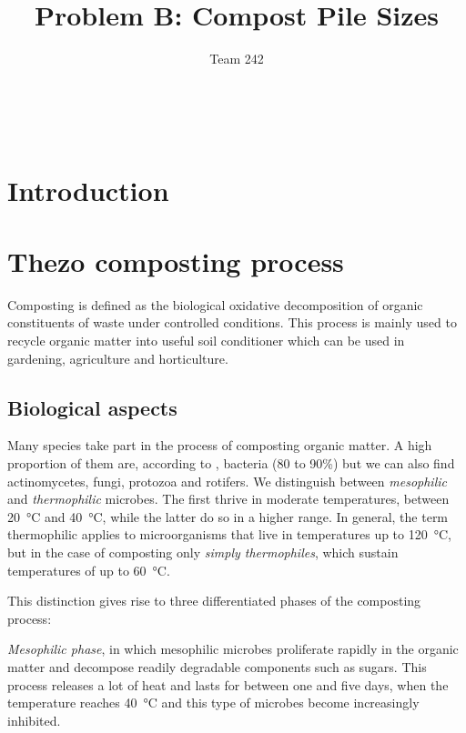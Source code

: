 \documentclass[12pt, a4paper, twocolumn, twoside]{article}
\title{\sffamily \bfseries Problem B: Compost Pile Sizes}
\author{\sffamily Team 242}
\date{}
\numberwithin{table}{section}
\numberwithin{figure}{section}
\numberwithin{equation}{section}
\begin{document}
\renewcommand{\abstractname}{}
\renewcommand{\absnamepos}{empty}
\begin{titlingpage}
 	\maketitle

\noindent \hrulefill \\
\begin{abstract}

\end{abstract}
\hrulefill
\end{titlingpage}

\begin{titlingpage}
	\tableofcontents
\end{titlingpage}

\section{Introduction}
\section{Thezo composting process}
Composting is defined as the biological oxidative decomposition of organic constituents of waste under controlled conditions. This process is mainly used to recycle organic matter into useful soil conditioner which can be used in gardening, agriculture and horticulture.

\subsection{Biological aspects}
Many species take part in the process of composting organic matter. A high proportion of them are, according to \cite{cornell}, bacteria (80 to 90\%) but we can also find actinomycetes, fungi, protozoa and rotifers. We distinguish between \emph{mesophilic} and \emph{thermophilic} microbes. The first thrive in moderate temperatures, between \SI{20}{\celsius} and \SI{40}{\celsius}, while the latter do so in a higher range. In general, the term thermophilic applies to microorganisms that live in temperatures up to \SI{120}{\celsius}, but in the case of composting only \emph{simply thermophiles}, which sustain temperatures of up to \SI{60}{\celsius}.

This distinction gives rise to three differentiated phases of the composting process:

\emph{Mesophilic phase}, in which mesophilic microbes proliferate rapidly in the organic matter and decompose readily degradable components such as sugars. This process releases a lot of heat and lasts for between one and five days, when the temperature reaches \SI{40}{\celsius} and this type of microbes become increasingly inhibited.
\end{document}
